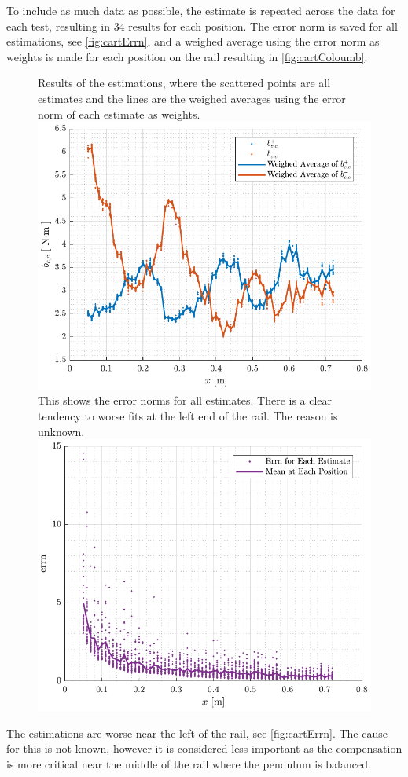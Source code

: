 %
To include as much data as possible, the estimate is repeated across the data for each test, resulting in \num{34} results for each position. The error norm is saved for all estimations, see \autoref{fig:cartErrn}, and a weighed average using the error norm as weights is made for each position on the rail resulting in \autoref{fig:cartColoumb}.
%
\begin{figure}[H]
  \hspace{1cm}
  \captionbox
  {
    Results of the estimations, where the scattered points are all estimates and the lines are the weighed averages using the error norm of each estimate as weights.
    \label{fig:cartColoumb}
  }
  {
    \hspace{-1cm}
    \includegraphics[width=.45\textwidth]{figures/cartColoumb}
  }
  \hspace{20pt}
  \captionbox 
  {
    This shows the error norms for all estimates. There is a clear tendency to worse fits at the left end of the rail. The reason is unknown.
    \label{fig:cartErrn}
  }
  {
    \hspace{-1cm}
    \includegraphics[width=.45\textwidth]{figures/cartErrn}
  }  
\end{figure}
%
The estimations are worse near the left of the rail, see \autoref{fig:cartErrn}. The cause for this is not known, however it is considered less important as the compensation is more critical near the middle of the rail where the pendulum is balanced.

